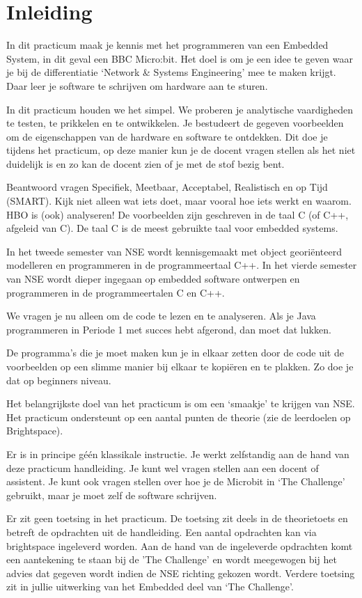 \chapter{Inleiding}


In dit practicum maak je kennis met het programmeren van een Embedded System, in dit geval een 
BBC Micro:bit. Het doel is om je een idee te geven waar je bij de differentiatie ‘Network \& Systems Engineering’ mee te maken krijgt. Daar leer je software te schrijven om hardware aan te sturen.

In dit practicum houden we het simpel. We proberen je analytische vaardigheden te testen, te prikkelen en te ontwikkelen. Je bestudeert de gegeven voorbeelden om de eigenschappen van de hardware en software te ontdekken. Dit doe je tijdens het practicum, op deze manier kun je de docent vragen stellen als het niet duidelijk is en zo kan de docent zien of je met de stof bezig bent.  

Beantwoord vragen Specifiek, Meetbaar, Acceptabel,  Realistisch en op Tijd (SMART). 
Kijk niet alleen wat iets doet, maar vooral hoe iets werkt en waarom. HBO is (ook) analyseren!
De voorbeelden zijn geschreven in de taal C (of C++, afgeleid van C). De taal C is de meest gebruikte taal voor embedded systems.

In het tweede semester van NSE wordt kennisgemaakt met object georiënteerd modelleren en programmeren in de programmeertaal C++. In het vierde semester van NSE wordt dieper ingegaan op embedded software ontwerpen en programmeren in de programmeertalen C en C++. 

We vragen je nu alleen om de code te lezen en te analyseren. Als je Java programmeren in Periode 1 met succes hebt afgerond, dan moet dat lukken. 

De programma’s die je moet maken kun je in elkaar zetten door de code uit de voorbeelden op een slimme manier bij elkaar te kopiëren en te plakken. Zo doe je dat op beginners niveau.

Het belangrijkste doel van het practicum is om een ‘smaakje’ te krijgen van NSE. 
Het practicum ondersteunt op een aantal punten de theorie (zie de leerdoelen op Brightspace). 

Er is in principe géén klassikale instructie. Je werkt zelfstandig aan de hand van deze practicum handleiding. Je kunt wel vragen stellen aan een docent of assistent. Je kunt ook vragen stellen over hoe je de Microbit in ‘The Challenge’ gebruikt, maar je moet zelf de software schrijven.

Er zit geen toetsing in het practicum. De toetsing zit deels in de theorietoets en betreft de opdrachten uit de handleiding. Een aantal opdrachten kan via brightspace ingeleverd worden. Aan de hand van de ingeleverde opdrachten komt een aantekening te staan bij de 'The Challenge' en wordt meegewogen bij het advies dat gegeven wordt indien de NSE richting gekozen wordt. Verdere toetsing zit in jullie uitwerking van het Embedded deel van ‘The Challenge’.

